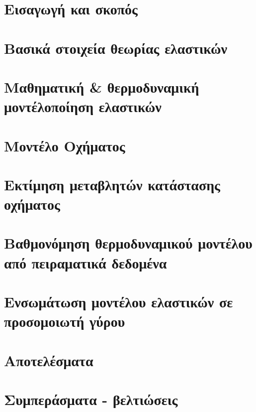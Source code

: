 {}
\section*{Εισαγωγή και σκοπός}

\clearoddpage
\section{Βασικά στοιχεία θεωρίας ελαστικών}
\label{sec:tyre_theory}

\clearoddpage
\section{Μαθηματική \& θερμοδυναμική μοντέλοποίηση ελαστικών}
\label{sec:tyre_model}

\clearoddpage
\section{Μοντέλο Οχήματος}
\label{sec:vehicle_model}

\clearoddpage
\section{Εκτίμηση μεταβλητών κατάστασης οχήματος}
\label{sec:inverseModel}

\clearoddpage
\section{Βαθμονόμηση θερμοδυναμικού μοντέλου από πειραματικά δεδομένα}
\label{sec:parameterFitting}

\clearoddpage
\section{Ενσωμάτωση μοντέλου ελαστικών σε προσομοιωτή γύρου}
\label{sec:lapSim}

\clearoddpage
\section{Αποτελέσματα}
\label{sec:results}

\clearoddpage
\section{Συμπεράσματα - βελτιώσεις}
\label{sec:conclusions}

\clearoddpage

